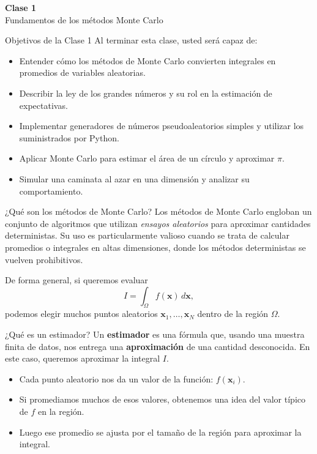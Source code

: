 \begin{frame}[plain]
\centering
\vfill
{\Huge \bfseries Clase 1}\\[0.4cm]
{\Large Fundamentos de los métodos Monte Carlo}
\vfill
\end{frame}

\begin{frame}{Objetivos de la Clase 1}
Al terminar esta clase, usted será capaz de:
\begin{itemize}
    \item Entender cómo los métodos de Monte Carlo convierten integrales en promedios de variables aleatorias.
    \item Describir la ley de los grandes números y su rol en la estimación de expectativas.
    \item Implementar generadores de números pseudoaleatorios simples y utilizar los suministrados por Python.
    \item Aplicar Monte Carlo para estimar el área de un círculo y aproximar $\pi$.
    \item Simular una caminata al azar en una dimensión y analizar su comportamiento.
\end{itemize}
\end{frame}

\begin{frame}{¿Qué son los métodos de Monte Carlo?}
\justifying
Los métodos de Monte Carlo engloban un conjunto de algoritmos que utilizan
\emph{ensayos aleatorios} para aproximar cantidades deterministas. Su uso es
particularmente valioso cuando se trata de calcular promedios o integrales en
altas dimensiones, donde los métodos deterministas se vuelven prohibitivos.

De forma general, si queremos evaluar
\begin{equation*}
I = \int_{\Omega} f(\bm{x})\, d\bm{x},
\end{equation*}
podemos elegir muchos puntos aleatorios $\bm{x}_1,\dots,\bm{x}_N$ dentro de la
región $\Omega$.

\begin{block}{¿Qué es un estimador?}
Un \textbf{estimador} es una fórmula que, usando una muestra finita de datos,
nos entrega una \textbf{aproximación} de una cantidad desconocida. En este
caso, queremos aproximar la integral $I$.
\end{block}

\begin{itemize}
    \item Cada punto aleatorio nos da un valor de la función: $f(\bm{x}_i)$.
    \item Si promediamos muchos de esos valores, obtenemos una idea del valor típico de $f$ en la región.
    \item Luego ese promedio se ajusta por el tamaño de la región para aproximar la integral.
\end{itemize}
\end{frame}

